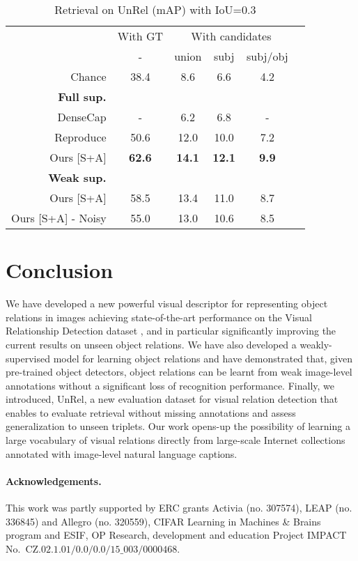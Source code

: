 \documentclass[10pt,twocolumn,letterpaper]{article}
\newcommand{\ra}[1]{\renewcommand{\arraystretch}{#1}}
\begin{document}
\begin{table}\centering
\small{
\ra{1}
\begin{tabular}{@{}rccccc@{}}\toprule
& \multicolumn{1}{c}{With GT} & \multicolumn{3}{c}{With candidates} \\
& - & union & subj & subj/obj
\\\midrule
\rule{0pt}{2ex}  
Chance 					& 38.4	& 8.6 	& 6.6 	& 4.2 \\
\rule{0pt}{2ex}  
\textbf{Full sup.}\\
\rule{0pt}{1ex} 
DenseCap \cite{Johnson2015} 		& - 		& 6.2 	& 6.8 	& - \\
Reproduce \cite{Lu16} 			& 50.6 	& 12.0 	& 10.0 	& 7.2  \\
Ours [S+A] 				&  \textbf{62.6} & \textbf{14.1} & \textbf{12.1} & \textbf{9.9} \\
\rule{0pt}{3ex}  
\textbf{Weak sup.}\\
\rule{0pt}{1ex} 
Ours [S+A] 					&  58.5 		& 13.4 	& 11.0 	& 8.7 \\
Ours [S+A] - Noisy			&  55.0 		& 13.0 	& 10.6	& 8.5 \\
\bottomrule
\end{tabular}
\setlength\abovecaptionskip{5pt}
\caption{Retrieval on UnRel (mAP) with IoU=0.3} 
\label{tab:results_rarerel}
}
\end{table}


\section{Conclusion}
We have developed a new powerful visual descriptor for representing object relations in images achieving state-of-the-art performance on the Visual Relationship Detection dataset \cite{Lu16}, and in particular significantly improving the current results on unseen object relations. We have also developed a weakly-supervised model for learning object relations and have demonstrated that, given pre-trained object detectors, object relations can be learnt from weak image-level annotations without a significant loss of recognition performance. Finally, we introduced, UnRel, a new evaluation dataset for visual relation detection that enables to evaluate retrieval without missing annotations and assess generalization to unseen triplets. Our work opens-up the possibility of learning a large vocabulary of visual relations directly from large-scale Internet collections annotated with image-level natural language captions.    


\paragraph{Acknowledgements.}
\small{This work was partly supported by ERC grants Activia (no. 307574),
LEAP (no. 336845) and Allegro (no. 320559), CIFAR Learning in Machines \& Brains program and ESIF, OP Research, development and education Project IMPACT
No.\ CZ$.02.1.01/0.0/0.0/15\_003/0000468$.}
\end{document}
